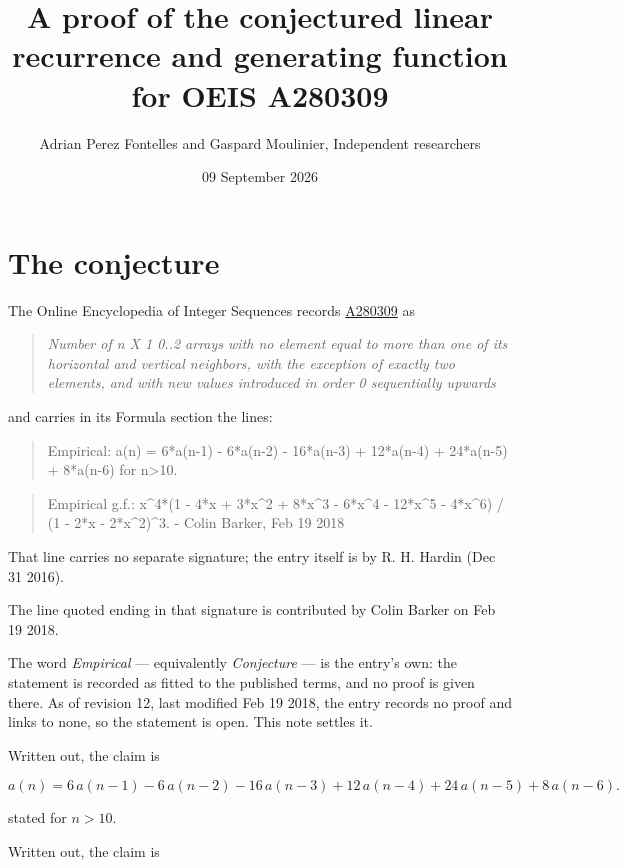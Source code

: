 \documentclass[11pt]{article}
\title{A proof of the conjectured linear recurrence and generating function for OEIS A280309}
\author{Adrian Perez Fontelles and Gaspard Moulinier, Independent researchers}
\date{09 September 2026}
\theoremstyle{definition}
\begin{document}
\maketitle
\section{The conjecture}

The Online Encyclopedia of Integer Sequences records \href{https://oeis.org/A280309}{A280309} as

\begin{quote}\itshape Number of n X 1 0..2 arrays with no element equal to more than one of its horizontal and vertical neighbors, with the exception of exactly two elements, and with new values introduced in order 0 sequentially upwards\end{quote}

and carries in its Formula section the lines:

\begin{quote}\ttfamily Empirical: a(n) = 6*a(n-1) - 6*a(n-2) - 16*a(n-3) + 12*a(n-4) + 24*a(n-5) + 8*a(n-6) for n>10.\end{quote}

\begin{quote}\ttfamily Empirical g.f.: x\textasciicircum{}4*(1 - 4*x + 3*x\textasciicircum{}2 + 8*x\textasciicircum{}3 - 6*x\textasciicircum{}4 - 12*x\textasciicircum{}5 - 4*x\textasciicircum{}6) / (1 - 2*x - 2*x\textasciicircum{}2)\textasciicircum{}3. - Colin Barker, Feb 19 2018\end{quote}

That line carries no separate signature; the entry itself is by R. H. Hardin (Dec 31 2016).

The line quoted ending in that signature is contributed by Colin Barker on Feb 19 2018.

The word {\itshape Empirical} --- equivalently {\itshape Conjecture} --- is the entry's own: the statement is recorded as fitted to the published terms, and no proof is given there. As of revision 12, last modified Feb 19 2018, the entry records no proof and links to none, so the statement is open. This note settles it.

Written out, the claim is

\[a(n) = 6\,a(n-1) - 6\,a(n-2) - 16\,a(n-3) + 12\,a(n-4) + 24\,a(n-5) + 8\,a(n-6).\]

stated for $n > 10$.

Written out, the claim is
\end{document}
